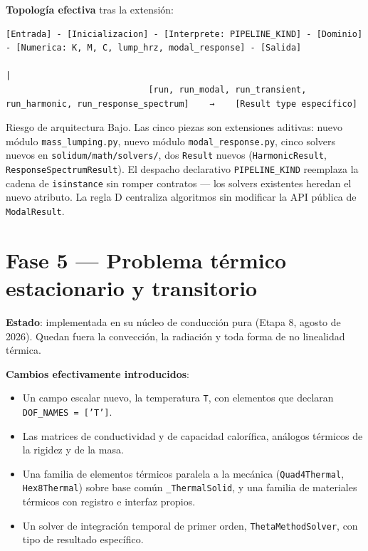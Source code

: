 \documentclass[11pt,oneside]{report}
\begin{document}
\textbf{Topología efectiva} tras la extensión:

\begin{lstlisting}
[Entrada] - [Inicializacion] - [Interprete: PIPELINE_KIND] - [Dominio] - [Numerica: K, M, C, lump_hrz, modal_response] - [Salida]
                                                                                                                          |
                            [run, run_modal, run_transient, run_harmonic, run_response_spectrum]    →    [Result type específico]

\end{lstlisting}

\begin{infobox}{Riesgo de arquitectura}
Bajo. Las cinco piezas son extensiones aditivas: nuevo módulo \texttt{mass\_lumping.py}, nuevo módulo \texttt{modal\_\allowbreak{}response.\allowbreak{}py}, cinco solvers nuevos en \texttt{solidum/\allowbreak{}math/\allowbreak{}solvers/\allowbreak{}}, dos \texttt{Result} nuevos (\texttt{HarmonicResult}, \texttt{ResponseSpectrumResult}). El despacho declarativo \texttt{PIPELINE\_KIND} reemplaza la cadena de \texttt{isinstance} sin romper contratos --- los solvers existentes heredan el nuevo atributo. La regla D centraliza algoritmos sin modificar la API pública de \texttt{ModalResult}.
\end{infobox}

\section{Fase 5 --- Problema térmico estacionario y transitorio}

\textbf{Estado}: implementada en su núcleo de conducción pura (Etapa 8, agosto de 2026). Quedan fuera la convección, la radiación y toda forma de no linealidad térmica.

\textbf{Cambios efectivamente introducidos}:

\begin{itemize}
  \item Un campo escalar nuevo, la temperatura \texttt{T}, con elementos que declaran \texttt{DOF\_\allowbreak{}NAMES = ['T']}.
  \item Las matrices de conductividad y de capacidad calorífica, análogos térmicos de la rigidez y de la masa.
  \item Una familia de elementos térmicos paralela a la mecánica (\texttt{Quad4Thermal}, \texttt{Hex8Thermal}) sobre base común \texttt{\_ThermalSolid}, y una familia de materiales térmicos con registro e interfaz propios.
  \item Un solver de integración temporal de primer orden, \texttt{ThetaMethodSolver}, con tipo de resultado específico.
\end{itemize}
\end{document}
